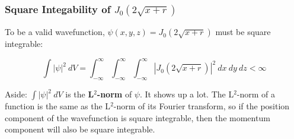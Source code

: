 \documentclass{beamer}
\begin{document}
\begin{frame}
\frametitle{Square Integability of $J_0(2\sqrt{x+r})$}


To be a valid wavefunction, $\psi(x,y,z) = J_0(2\sqrt{x+r})$ must be square integrable:

\[ \int |\psi|^2\ dV = \int_{-\infty}^{\infty} \int_{-\infty}^{\infty} \int_{-\infty}^{\infty} \left|J_0(2\sqrt{x+r})\right|^2\ dx\ dy\ dz  < \infty\]

Aside: $\int |\psi|^2\ dV$ is the {\bf L$^2$-norm} of $\psi$.  It shows up a lot.  The L$^2$-norm of
a function is the same as the L$^2$-norm of its Fourier transform, so if the position component of the
wavefunction is square integrable, then the momentum component will also be square integrable.


\end{frame}
\end{document}
